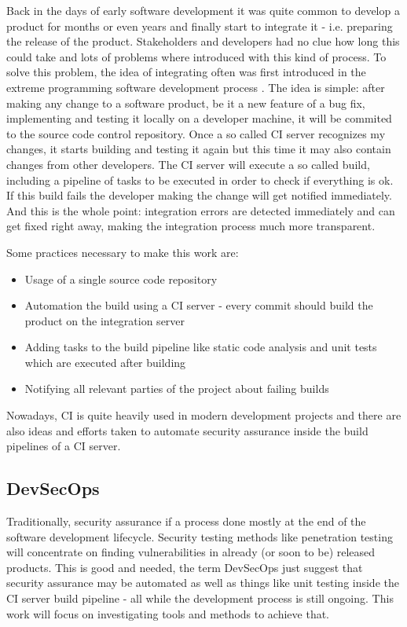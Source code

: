 \documentclass[conference]{IEEEtran}
\begin{document}
Back in the days of early software development it was quite common to develop a product for months or even years and finally start to integrate it - i.e. preparing the release of the product. Stakeholders and developers had no clue how long this could take and lots of problems where introduced with this kind of process. To solve this problem, the idea of integrating often was first introduced in the extreme programming software development process \cite{xp}. The idea is simple: after making any change to a software product, be it a new feature of a bug fix, implementing and testing it locally on a developer machine, it will be commited to the source code control repository. Once a so called CI server recognizes my changes, it starts building and testing it again but this time it may also contain changes from other developers. The CI server will execute a so called build, including a pipeline of tasks to be executed in order to check if everything is ok. If this build fails the developer making the change will get notified immediately. And this is the whole point: integration errors are detected immediately and can get fixed right away, making the integration process much more transparent.

Some practices necessary to make this work are: 

\begin{itemize}
	\item Usage of a single source code repository
	\item Automation the build using a CI server - every commit should build the product on the integration server
	\item Adding tasks to the build pipeline like static code analysis and unit tests which are executed after building
	\item Notifying all relevant parties of the project about failing builds
\end{itemize}

Nowadays, CI is quite heavily used in modern development projects and there are also ideas and efforts taken to automate security assurance inside the build pipelines of a CI server. 

\subsection{DevSecOps}

Traditionally, security assurance if a process done mostly at the end of the software development lifecycle. Security testing methods like penetration testing will concentrate on finding vulnerabilities in already (or soon to be) released products. This is good and needed, the term DevSecOps just suggest that security assurance may be automated as well as things like unit testing inside the CI server build pipeline - all while the development process is still ongoing. This work will focus on investigating tools and methods to achieve that.
\end{document}

